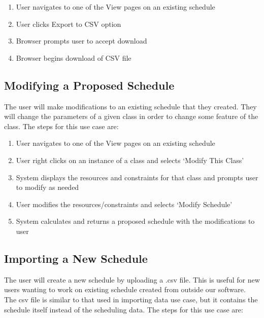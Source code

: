 \documentclass{extarticle}
\begin{document}
\begin{enumerate}
\item User navigates to one of the View pages on an existing schedule
\item User clicks Export to CSV option
\item Browser prompts user to accept download
\item Browser begins download of CSV file
\end{enumerate}


\subsection{Modifying a Proposed Schedule} \label{usecase.modify}
The user will make modifications to an existing schedule that they created.  They will change the parameters
of a given class in order to change some feature of the class.  The steps for this use case are:

\begin{enumerate}
\item User navigates to one of the View pages on an existing schedule
\item User right clicks on an instance of a class and selects `Modify This Class'
\item System displays the resources and constraints for that class and prompts user to modify as needed
\item User modifies the resources/constraints and selects `Modify Schedule'
\item System calculates and returns a proposed schedule with the modifications to user
\end{enumerate}


\subsection{Importing a New Schedule}

The user will create a new schedule by uploading a .csv file. This is useful for new users wanting to work on existing schedule created from outside our software. The csv file is similar to that used in importing data use case, but it contains the schedule itself instead of the scheduling data. The steps for this use case are:
\end{document}
